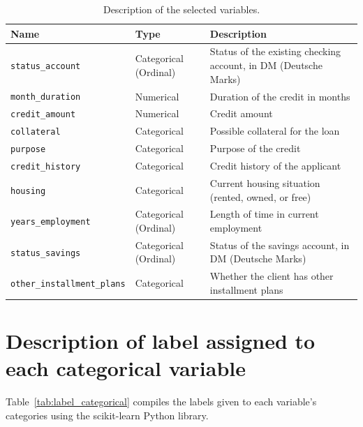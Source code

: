 \documentclass{ieeeaccess}
\begin{document}
\begin{table}[!t]
  \caption{Description of the selected variables.}
  \label{tab:variables_descriptions}
  \centering
  \begin{tabular}{llp{}}
    \toprule
    Name & Type & Description \\
    \midrule
    \texttt{status\_account}           & Categorical (Ordinal)     & Status of the existing checking account, in DM (Deutsche Marks) \\
    \texttt{month\_duration}           & Numerical   & Duration of the credit in months \\
    \texttt{credit\_amount}            & Numerical   & Credit amount \\
    \texttt{collateral}                & Categorical & Possible collateral for the loan \\
    \texttt{purpose}                   & Categorical & Purpose of the credit \\
    \texttt{credit\_history}           & Categorical & Credit history of the applicant \\
    \texttt{housing}                   & Categorical & Current housing situation (rented, owned, or free) \\
    \texttt{years\_employment}         & Categorical (Ordinal)     & Length of time in current employment \\
    \texttt{status\_savings}           & Categorical (Ordinal)     & Status of the savings account, in DM (Deutsche Marks) \\
    \texttt{other\_installment\_plans} & Categorical & Whether the client has other installment plans \\
    \bottomrule
  \end{tabular}
\end{table}

\section{Description of label assigned to each categorical variable}
\label{ap:label_categorical}

Table~\ref{tab:label_categorical} compiles the labels given to each variable's categories using the scikit-learn Python library.
\end{document}
